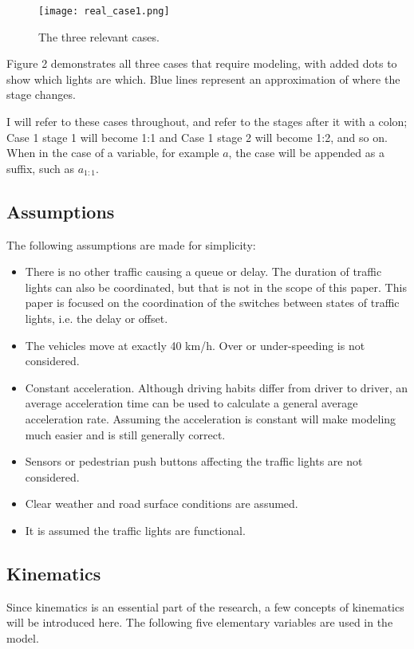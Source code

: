 \documentclass[11pt]{article}
\begin{document}
\begin{figure}[h!]
    \centering
    \texttt{[image: real\_case1.png]}
    \caption{The three relevant cases.}
    \label{allcases}
\end{figure}

Figure 2 demonstrates all three cases that require modeling, with added dots to show which lights are which. Blue lines represent an approximation of where the stage changes.

I will refer to these cases throughout, and refer to the stages after it with a colon; Case 1 stage 1 will become 1:1 and Case 1 stage 2 will become 1:2, and so on. When in the case of a variable, for example $a$, the case will be appended as a suffix, such as $a_{1:1}$.

\subsection{Assumptions}

The following assumptions are made for simplicity:

\begin{itemize}
\item There is no other traffic causing a queue or delay. The duration of traffic lights can also be coordinated, but that is not in the scope of this paper. This paper is focused on the coordination of the switches between states of traffic lights, i.e. the delay or offset.
\item The vehicles move at exactly 40 km/h. Over or under-speeding is not considered. 
\item Constant acceleration. Although driving habits differ from driver to driver, an average acceleration time can be used to calculate a general average acceleration rate. Assuming the acceleration is constant will make modeling much easier and is still generally correct.
\item Sensors or pedestrian push buttons affecting the traffic lights are not considered. 
\item Clear weather and road surface conditions are assumed. 
\item It is assumed the traffic lights are functional.
\end{itemize}


\subsection{Kinematics}

Since kinematics is an essential part of the research, a few concepts of kinematics will be introduced here. The following five elementary variables are used in the model. 
\end{document}

